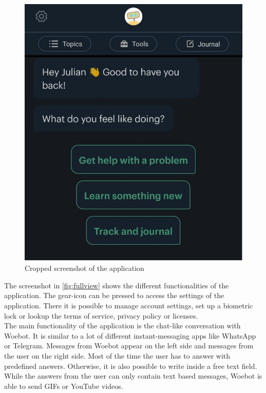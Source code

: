 \begin{figure}[ht]
  \begin{center}
    \includegraphics[width=1\columnwidth]{files/fullview.png}
    \caption{\label{fig:fullview} Cropped screenshot of the application}
  \end{center}
\end{figure}

The screenshot in \autoref{fig:fullview} shows the different functionalities of the application.
The gear-icon can be pressed to access the settings of the application.
There it is possible to manage account settings, set up a biometric lock or lookup the terms of service, privacy policy or licenses.\\

The main functionality of the application is the chat-like conversation with Woebot.
It is similar to a lot of different instant-messaging apps like WhatsApp or Telegram\cite{whatsapp, telegram}.
Messages from Woebot appear on the left side and messages from the user on the right side.
Most of the time the user has to answer with predefined answers.
Otherwise, it is also possible to write inside a free text field.
While the answers from the user can only contain text based messages, Woebot is able to send GIFs or YouTube videos\cite{youtube}.\\

